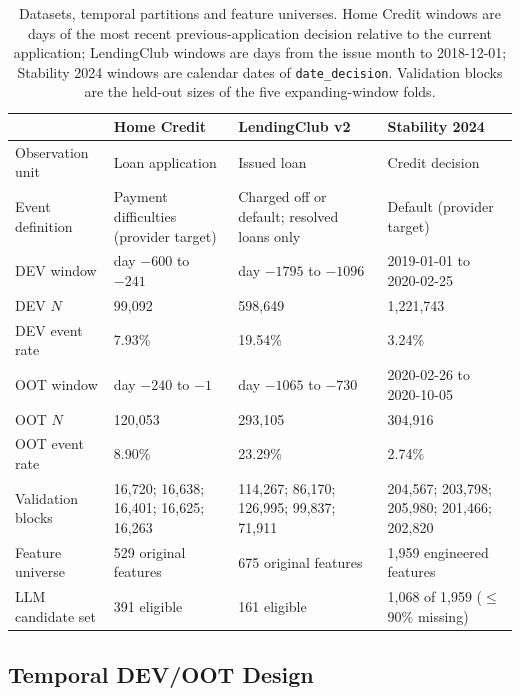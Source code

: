 \documentclass[final,5p,twocolumn]{elsarticle}
\begin{document}
\begin{table}[htbp]
\centering
\footnotesize
\begin{threeparttable}
\caption{Datasets, temporal partitions and feature universes. Home Credit windows are days of the most recent previous-application decision relative to the current application; LendingClub windows are days from the issue month to 2018-12-01; Stability 2024 windows are calendar dates of \texttt{date\_decision}. Validation blocks are the held-out sizes of the five expanding-window folds.}
\label{tab:datasets}
\begin{tabular}{@{}lL{29mm}L{31mm}L{31mm}@{}}
\toprule
 & Home Credit & LendingClub v2 & Stability 2024 \\
\midrule
Observation unit & Loan application & Issued loan & Credit decision \\
Event definition & Payment difficulties (provider target) & Charged off or default; resolved loans only & Default (provider target) \\
DEV window & day $-600$ to $-241$ & day $-1795$ to $-1096$ & 2019-01-01 to 2020-02-25 \\
DEV $N$ & 99,092 & 598,649 & 1,221,743 \\
DEV event rate & 7.93\% & 19.54\% & 3.24\% \\
OOT window & day $-240$ to $-1$ & day $-1065$ to $-730$ & 2020-02-26 to 2020-10-05 \\
OOT $N$ & 120,053 & 293,105 & 304,916 \\
OOT event rate & 8.90\% & 23.29\% & 2.74\% \\
Validation blocks & 16,720; 16,638; 16,401; 16,625; 16,263 & 114,267; 86,170; 126,995; 99,837; 71,911 & 204,567; 203,798; 205,980; 201,466; 202,820 \\
Feature universe & 529 original features & 675 original features & 1,959 engineered features \\
LLM candidate set & 391 eligible & 161 eligible & 1,068 of 1,959 ($\le$90\% missing) \\
\bottomrule
\end{tabular}
\end{threeparttable}
\end{table}

\subsection{Temporal DEV/OOT Design}
\label{subsec:dev_oot}
\end{document}
